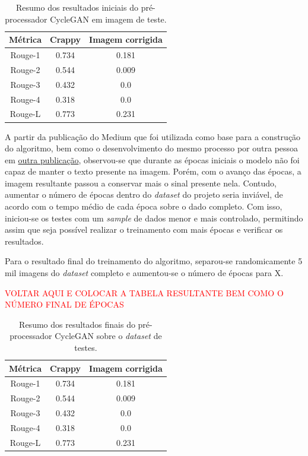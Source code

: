 \begin{table}[H]
  \centering
  \caption{Resumo dos resultados iniciais do pré-processador CycleGAN em imagem de teste.}
  \begin{tabular}{|c|c|c|}
    \hline
      \textbf{Métrica}  &
      \textbf{Crappy}  &
      \textbf{Imagem corrigida} \\
    \hline
      Rouge-1  &
      0.734 &
      0.181 \\
    \hline
      Rouge-2  &
      0.544 &
      0.009 \\
    \hline
      Rouge-3  &
      0.432 &
      0.0 \\
    \hline
      Rouge-4  &
      0.318 &
      0.0 \\
    \hline
      Rouge-L &
      0.773 &
      0.231 \\
    \hline
  \end{tabular}
  \label{tab:first-cycle-gan-rouge-n}
\end{table}

A partir da publicação do Medium que foi utilizada como base para a construção do algoritmo, bem como o desenvolvimento do mesmo processo por outra pessoa em \href{https://medium.com/towards-artificial-intelligence/cyclegan-as-a-denoising-engine-for-ocr-images-8d2a4988f769}{outra publicação}, observou-se que durante as épocas iniciais o modelo não foi capaz de manter o texto presente na imagem. Porém, com o avanço das épocas, a imagem resultante passou a conservar mais o sinal presente nela. Contudo, aumentar o número de épocas dentro do \textit{dataset} do projeto seria inviável, de acordo com o tempo médio de cada época sobre o dado completo. Com isso, iniciou-se os testes com um \textit{sample} de dados menor e mais controlado, permitindo assim que seja possível realizar o treinamento com mais épocas e verificar os resultados.

Para o resultado final do treinamento do algoritmo, separou-se randomicamente 5 mil imagens do \textit{dataset} completo e aumentou-se o número de épocas para X.

\textcolor{red}{VOLTAR AQUI E COLOCAR A TABELA RESULTANTE BEM COMO O NÚMERO FINAL DE ÉPOCAS}

\begin{table}[H]
  \centering
  \caption{Resumo dos resultados finais do pré-processador CycleGAN sobre o \textit{dataset} de testes.}
  \begin{tabular}{|c|c|c|}
    \hline
      \textbf{Métrica}  &
      \textbf{Crappy}  &
      \textbf{Imagem corrigida} \\
    \hline
      Rouge-1  &
      0.734 &
      0.181 \\
    \hline
      Rouge-2  &
      0.544 &
      0.009 \\
    \hline
      Rouge-3  &
      0.432 &
      0.0 \\
    \hline
      Rouge-4  &
      0.318 &
      0.0 \\
    \hline
      Rouge-L &
      0.773 &
      0.231 \\
    \hline
  \end{tabular}
  \label{tab:cycle-gan-rouge-n-result}
\end{table}

